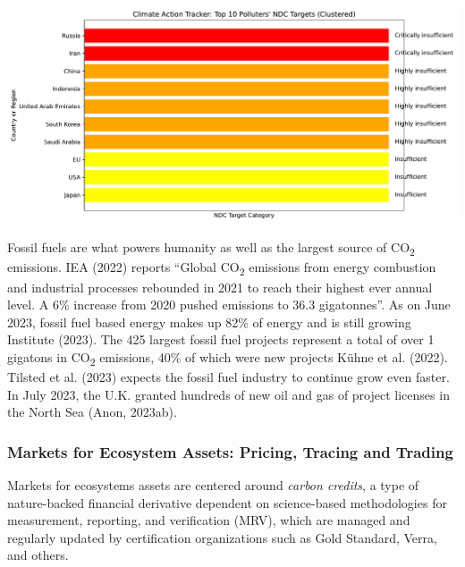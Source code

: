 \documentclass[
  letterpaper,
  DIV=11,
  numbers=noendperiod]{scrartcl}
\begin{document}
\includegraphics{_thesis_files/figure-pdf/cell-15-output-1.pdf}

Fossil fuels are what powers humanity as well as the largest source of
CO\textsubscript{2} emissions. IEA (2022) reports ``Global
CO\textsubscript{2} emissions from energy combustion and industrial
processes rebounded in 2021 to reach their highest ever annual level. A
6\% increase from 2020 pushed emissions to 36.3 gigatonnes''. As on June
2023, fossil fuel based energy makes up 82\% of energy and is still
growing Institute (2023). The 425 largest fossil fuel projects represent
a total of over 1 gigatons in CO\textsubscript{2} emissions, 40\% of
which were new projects Kühne et al. (2022). Tilsted et al. (2023)
expects the fossil fuel industry to continue grow even faster. In July
2023, the U.K. granted hundreds of new oil and gas of project licenses
in the North Sea (Anon, 2023ab).

\subsubsection{Markets for Ecosystem Assets: Pricing, Tracing and
Trading}\label{markets-for-ecosystem-assets-pricing-tracing-and-trading}

Markets for ecosystems assets are centered around \emph{carbon credits},
a type of nature-backed financial derivative dependent on science-based
methodologies for measurement, reporting, and verification (MRV), which
are managed and regularly updated by certification organizations such as
Gold Standard, Verra, and others.
\end{document}
